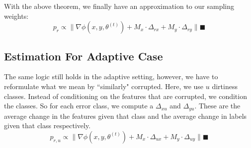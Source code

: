 With the above theorem, we finally have an approximation to our sampling weights: 
\[p_{r}\propto\|\nabla\phi(x,y,\theta^{(t)}) + M_x \cdot \Delta_{rx} +  M_y \cdot \Delta_{ry}\|
\blacksquare
\]

\subsection{Estimation For Adaptive Case}
The same logic still holds in the adaptive setting, however, we have to reformulate what we mean by ``similarly" corrupted.
Here, we use $u$ dirtiness classes.
Instead of conditioning on the features that are corrupted, we condition the classes.
So for each error class, we compute a $\Delta_{xu}$ and $\Delta_{yu}$.
These are the average change in the features given that class and the average change in labels given that class respectively.
\[
p_{r,u}\propto\|\nabla\phi(x,y,\theta^{(t)}) + M_x \cdot \Delta_{ux} +  M_y \cdot \Delta_{uy}\|
\blacksquare
\] 

